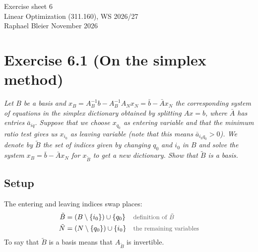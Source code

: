 \documentclass[a4paper,11pt]{article}
\newif\ifexplain
\newcommand{\aufgabe}[1]{\section*{#1}}
\newcommand{\angabe}[1]{\textit{#1}\par\smallskip}
\newcommand{\teil}[1]{\subsection*{#1}}
\newcommand{\why}[1]{\text{\small\color{black!65}#1}}
\newcommand{\explain}[1]{\ifexplain\begin{erklbox}#1\end{erklbox}\fi}
\begin{document}
\begin{center}
{\Large Exercise sheet 6}\\
Linear Optimization (311.160), WS 2026/27\\
Raphael Bleier  November 2026
\end{center}
\explain{Dieses Blatt dreht sich um die Frage, wie ein Simplex-Schritt das Dictionary erneuert. Bland's Rule ist eine feste Indexregel gegen Zylen: bei gleichberechtigten Kandidaten nimmt man den kleinsten Variablenindex. In 6.2 bauen wir eine zulässige Startbasis mit künstlichen Variablen, und 6.3 verpackt alles in eine Schleife, die Example 2.2 aus der Vorlesung löst.}

\aufgabe{Exercise 6.1 (On the simplex method)}
\angabe{Let $B$ be a basis and $x_B=A_B^{-1}b-A_B^{-1}A_Nx_N=\bar b-\bar Ax_N$ the corresponding system of equations in the simplex dictionary obtained by splitting $Ax=b$, where $\bar A$ has entries $\bar a_{iq}$. Suppose that we choose $x_{q_0}$ as entering variable and that the minimum ratio test gives us $x_{i_0}$ as leaving variable (note that this means $\bar a_{i_0q_0}>0$). We denote by $\tilde B$ the set of indices given by changing $q_0$ and $i_0$ in $B$ and solve the system $x_B=\bar b-\bar Ax_N$ for $x_{\tilde B}$ to get a new dictionary. Show that $\tilde B$ is a basis.}
\explain{Eine Basis ist eine Indexmenge, deren Spalten in $A$ eine invertierbare Teilmatrix bilden. Zu zeigen ist also: $A_{\tilde B}$ ist invertierbar. Der Weg läuft über den Hinweis des Blatts in drei Schritten: erst zeigen, dass das neue Dictionary mit $Ax=b$ äquivalent ist, dann dass zu jedem $x_{\tilde N}$ genau ein $x_{\tilde B}$ passt, und daraus die Invertierbarkeit folgern.}
\teil{Setup}
The entering and leaving indices swap places:
\begin{align*}
\tilde B&=(B\setminus\{i_0\})\cup\{q_0\}&&\why{definition of $\tilde B$}\\
\tilde N&=(N\setminus\{q_0\})\cup\{i_0\}&&\why{the remaining variables}
\end{align*}
To say that $\tilde B$ is a basis means that $A_{\tilde B}$ is invertible.
\explain{Vorab die Rollenverteilung: $q_0$ ist der Index der eintretenden Variablen aus der Nichtbasis, $i_0$ der der austretenden aus der Basis. Die Voraussetzung $\bar a_{i_0q_0}>0$ garantiert, dass wir die Zeile $i_0$ nach $x_{q_0}$ auflösen dürfen, denn wir teilen durch $\bar a_{i_0q_0}\neq 0$. Dass der Eintrag positiv und nicht nur von null verschieden ist, brauchen wir für die Zulässigkeit der neuen Ecke, nicht für den Beweis selbst.}
\end{document}
